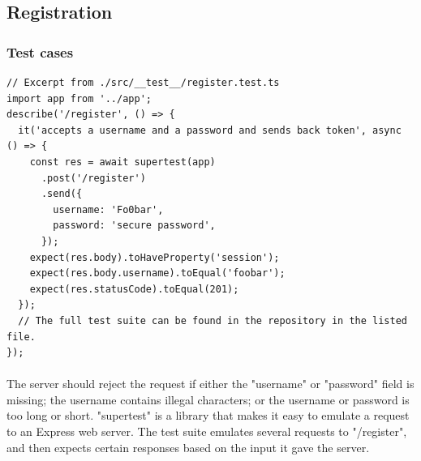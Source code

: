 \documentclass{report}
\begin{document}
\subsection{Registration}
\subsubsection{Test cases}

\begin{verbatim}
// Excerpt from ./src/__test__/register.test.ts
import app from '../app';
describe('/register', () => {
  it('accepts a username and a password and sends back token', async () => {
    const res = await supertest(app)
      .post('/register')
      .send({
        username: 'Fo0bar',
        password: 'secure password',
      });
    expect(res.body).toHaveProperty('session');
    expect(res.body.username).toEqual('foobar');
    expect(res.statusCode).toEqual(201);
  });
  // The full test suite can be found in the repository in the listed file.
});
\end{verbatim}

\paragraph{}
The server should reject the request if either the "username" or "password" field is missing; the username contains illegal characters; or the username or password is too long or short. "supertest" is a library that makes it easy to emulate a request to an Express web server. The test suite emulates several requests to "/register", and then expects certain responses based on the input it gave the server.
\end{document}
